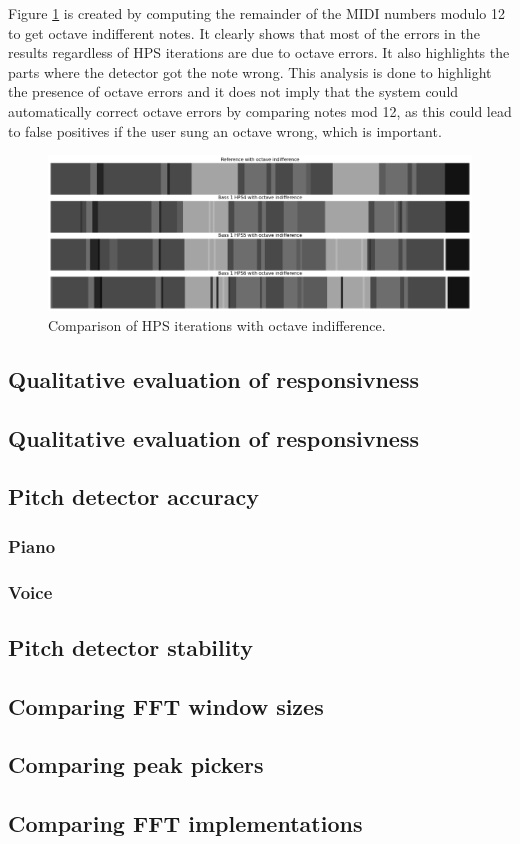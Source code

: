 Figure \ref{fig:hpsOctaveErrors} is created by computing the remainder of the MIDI numbers modulo 12 to get octave indifferent notes. It clearly shows that most of the errors in the results regardless of HPS iterations are due to octave errors. It also highlights the parts where the detector got the note wrong. This analysis is done to highlight the presence of octave errors and it does not imply that the system could automatically correct octave errors by comparing notes mod 12, as this could lead to false positives if the user sung an octave wrong, which is important.

\begin{figure}[ht]
    \centering
    \includegraphics[width=\textwidth]{./images/hpsOctaveErrors.png}
    \caption{Comparison of HPS iterations with octave indifference. \label{fig:hpsOctaveErrors}}
\end{figure}


\subsection{Qualitative evaluation of responsivness}
\subsection{Qualitative evaluation of responsivness}
\subsection{Pitch detector accuracy}





\subsubsection{Piano}
\subsubsection{Voice}
\subsection{Pitch detector stability}
\subsection{Comparing FFT window sizes}
\subsection{Comparing peak pickers}
\subsection{Comparing FFT implementations}